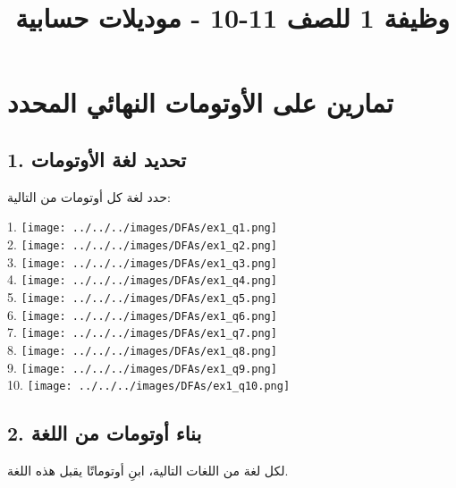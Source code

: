 \documentclass[12pt]{article}
\title{وظيفة 1 للصف 11-10 - موديلات حسابية}
\begin{document}
\maketitle

\section*{تمارين على الأوتومات النهائي المحدد}

\subsection*{1. تحديد لغة الأوتومات}

حدد لغة كل أوتومات من التالية:

1.
\texttt{[image: ../../../images/DFAs/ex1\_q1.png]}\\

2.
\texttt{[image: ../../../images/DFAs/ex1\_q2.png]}\\

3.
\texttt{[image: ../../../images/DFAs/ex1\_q3.png]}\\

4.
\texttt{[image: ../../../images/DFAs/ex1\_q4.png]}\\

5.
\texttt{[image: ../../../images/DFAs/ex1\_q5.png]}\\

6.
\texttt{[image: ../../../images/DFAs/ex1\_q6.png]}\\

7.
\texttt{[image: ../../../images/DFAs/ex1\_q7.png]}\\

8.
\texttt{[image: ../../../images/DFAs/ex1\_q8.png]}\\

9.
\texttt{[image: ../../../images/DFAs/ex1\_q9.png]}\\

10.
\texttt{[image: ../../../images/DFAs/ex1\_q10.png]}

\subsection*{2. بناء أوتومات من اللغة}


لكل لغة من اللغات التالية، ابنِ أوتوماتًا يقبل هذه اللغة.
\end{document}
